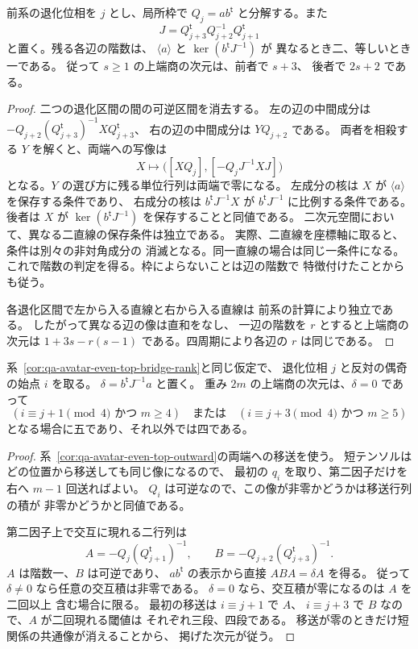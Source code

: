 \begin{corollary}[一退化位相での上端商の次元判定]
\label{cor:qa-avatar-even-top-bridge-rank}
前系の退化位相を $j$ とし、局所枠で
$Q_j=a b^{\mathsf t}$ と分解する。また
\[
 J=Q_{j+3}^{\mathsf t}Q_{j+2}^{-1}Q_{j+1}^{\mathsf t}
\]
と置く。残る各辺の階数は、
$\langle a\rangle$ と $\ker(b^{\mathsf t}J^{-1})$ が
異なるとき二、等しいとき一である。
従って $s\geq1$ の上端商の次元は、前者で $s+3$、
後者で $2s+2$ である。
\end{corollary}
\begin{proof}
二つの退化区間の間の可逆区間を消去する。
左の辺の中間成分は
$-Q_{j+2}(Q_{j+3}^{\mathsf t})^{-1}XQ_{j+3}^{\mathsf t}$、
右の辺の中間成分は $YQ_{j+2}$ である。
両者を相殺する $Y$ を解くと、両端への写像は
\[
 X\longmapsto
 \bigl([XQ_j],[-Q_j J^{-1}XJ]\bigr)
\]
となる。$Y$ の選び方に残る単位行列は両端で零になる。
左成分の核は $X$ が $\langle a\rangle$ を保存する条件であり、
右成分の核は $b^{\mathsf t}J^{-1}X$ が
$b^{\mathsf t}J^{-1}$ に比例する条件である。
後者は $X$ が $\ker(b^{\mathsf t}J^{-1})$ を保存することと同値である。
二次元空間において、異なる二直線の保存条件は独立である。
実際、二直線を座標軸に取ると、条件は別々の非対角成分の
消滅となる。同一直線の場合は同じ一条件になる。
これで階数の判定を得る。枠によらないことは辺の階数で
特徴付けたことからも従う。

各退化区間で左から入る直線と右から入る直線は
前系の計算により独立である。
したがって異なる辺の像は直和をなし、
一辺の階数を $r$ とすると上端商の次元は
$1+3s-r(s-1)$ である。四周期により各辺の $r$ は同じである。
\end{proof}

\begin{corollary}[反対の始点偶奇における一退化位相]
\label{cor:qa-avatar-even-top-outward-single}
系~\ref{cor:qa-avatar-even-top-bridge-rank}と同じ仮定で、
退化位相 $j$ と反対の偶奇の始点 $i$ を取る。
$\delta=b^{\mathsf t}J^{-1}a$ と置く。
重み $2m$ の上端商の次元は、$\delta=0$ であって
\[
 (i\equiv j+1\pmod4\text{ かつ }m\geq4)
 \quad\text{または}\quad
 (i\equiv j+3\pmod4\text{ かつ }m\geq5)
\]
となる場合に五であり、それ以外では四である。
\end{corollary}
\begin{proof}
系~\ref{cor:qa-avatar-even-top-outward}の両端への移送を使う。
短テンソルはどの位置から移送しても同じ像になるので、
最初の $q_i$ を取り、第二因子だけを右へ $m-1$ 回送ればよい。
$Q_i$ は可逆なので、この像が非零かどうかは移送行列の積が
非零かどうかと同値である。

第二因子上で交互に現れる二行列は
\[
 A=-Q_j(Q_{j+1}^{\mathsf t})^{-1},\qquad
 B=-Q_{j+2}(Q_{j+3}^{\mathsf t})^{-1}.
\]
$A$ は階数一、$B$ は可逆であり、
$a b^{\mathsf t}$ の表示から直接 $ABA=\delta A$ を得る。
従って $\delta\ne0$ なら任意の交互積は非零である。
$\delta=0$ なら、交互積が零になるのは $A$ を二回以上
含む場合に限る。
最初の移送は $i\equiv j+1$ で $A$、
$i\equiv j+3$ で $B$ なので、$A$ が二回現れる閾値は
それぞれ三段、四段である。
移送が零のときだけ短関係の共通像が消えることから、
掲げた次元が従う。
\end{proof}

